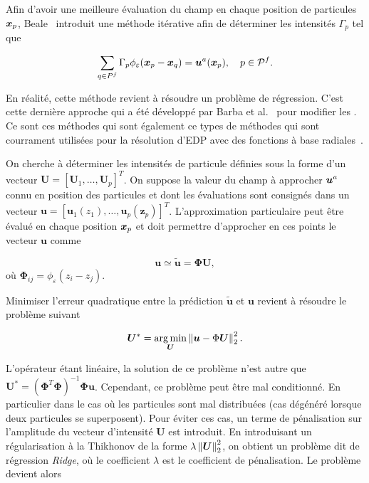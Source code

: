 Afin d'avoir une meilleure évaluation du champ en chaque position de particules $\bm{x}_p$, Beale~\cite{beale_accuracy_1988} introduit une méthode itérative afin de déterminer les intensités $\Gamma_p$ tel que

\begin{equation*}
    \sum_{q \in P^f} \Gamma_p \phi_\varepsilon(\bm{x}_p - \bm{x}_q) = \bm{u}^a(\bm{x}_p), \quad p \in \mathcal{P}^f.
\end{equation*}

En réalité, cette méthode revient à résoudre un problème de régression. C'est cette dernière approche qui a été développé par Barba et al.~\cite{barbara} pour modifier les . Ce sont ces méthodes qui sont également ce types de méthodes qui sont courrament utilisées pour la résolution d'EDP avec des fonctions à base radiales~\cite{Fornberg_Flyer_2015}.

On cherche à déterminer les intensités de particule définies sous la forme d'un vecteur $\bm{U} = [\bm U_1, \dots, \bm U_p]^T$. On suppose la valeur du champ à approcher $\bm{u}^a$ connu en position des particules et dont les évaluations sont consignés dans un vecteur $\bm{u} = [\bm u_1(z_1), \dots, \bm u_p(\bm z_p)]^T$. L'approximation particulaire peut être évalué en chaque position $\bm{x}_p$ et doit permettre d'approcher en ces points le vecteur $\bm{u}$ comme

\begin{equation*}
    \bm{u} \simeq \tilde{\bm u} = \bm \Phi \bm{U},
\end{equation*}où $\bm \Phi_{ij} = \phi_\varepsilon(z_i - z_j)$.

Minimiser l'erreur quadratique entre la prédiction $\tilde{\bm u}$ et $\bm{u}$ revient à résoudre le problème suivant

\begin{equation*}
    \bm{U}^*= \operatorname*{arg\,min}_{\bm{U}} \left\lVert \bm{u} - \Phi \bm{U} \right\rVert^2_2.
\end{equation*}

L'opérateur étant linéaire, la solution de ce problème n'est autre que $\bm U^*  = (\bm \Phi^T \bm \Phi)^{-1} \bm \Phi \bm{u}$. Cependant, ce problème peut être mal conditionné. En particulier dans le cas où les particules sont mal distribuées (cas dégénéré lorsque deux particules se superposent). Pour éviter ces cas, un terme de pénalisation sur l'amplitude du vecteur d'intensité $\bm{U}$ est introduit. En introduisant un régularisation à la Thikhonov de la forme $\lambda \left\lVert \bm U \right\rVert_2^2$, on obtient un problème dit de régression \textit{Ridge}, où le coefficient $\lambda$ est le coefficient de pénalisation. Le problème devient alors

